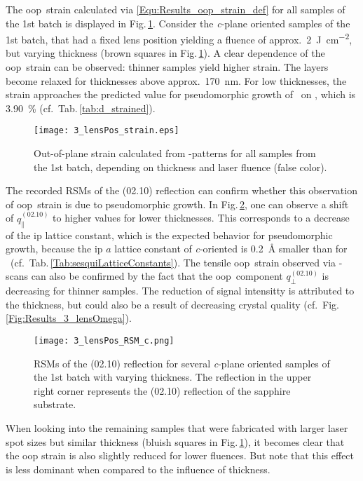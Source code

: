 The \gls{oop}\ strain calculated via \eqref{Equ:Results_oop_strain_def} for all samples of the 1st batch is displayed in Fig.\,\ref{Fig:Results_3_lensStrain}.
Consider the \textit{c}-plane oriented samples of the 1st batch, that had a fixed lens position yielding a fluence of approx.\ \qty{2}{\joule\per\cm\squared}, but varying thickness (brown squares in Fig.\,\ref{Fig:Results_3_lensStrain}).
A clear dependence of the \gls{oop}\ strain can be observed: thinner samples yield higher strain.
The layers become relaxed for thicknesses above approx.\ \qty{170}{\nm}.
For low thicknesses, the strain approaches the predicted value for pseudomorphic growth of \cro\ on , which is \qty{3.90}{\percent} (cf.\ Tab.\,\ref{tab:d_strained}).
\begin{figure}
    \centering
    \texttt{[image: 3\_lensPos\_strain.eps]}
    \caption{
        Out-of-plane strain calculated from \thetaomega-patterns for all samples from the 1st batch, depending on thickness and laser fluence (false color).
    }
    \label{Fig:Results_3_lensStrain}
\end{figure}
The recorded \glspl{RSM} of the (02.10) reflection can confirm whether this observation of \gls{oop}\ strain is due to pseudomorphic growth.
In Fig.\,\ref{Fig:Results_3_cRSMs}, one can observe a shift of $q_\parallel^{(02.10)}$ to higher values for lower thicknesses.
This corresponds to a decrease of the \gls{ip} lattice constant, which is the expected behavior for pseudomorphic growth, because the \gls{ip} $a$ lattice constant of \textit{c}-oriented  is \qty{0.2}{\angstrom} smaller than for \cro\ (cf.~Tab.\,\ref{Tab:sesquiLatticeConstants}).
The tensile \gls{oop}\ strain observed via \thetaomega-scans can also be confirmed by the fact that the \gls{oop}\ component $q_\perp^{(02.10)}$ is decreasing for thinner samples.
The reduction of signal intensitty is attributed to the thickness, but could also be a result of decreasing crystal quality (cf.~Fig.\,\ref{Fig:Results_3_lensOmega}).
\begin{figure}
    \centering
    \texttt{[image: 3\_lensPos\_RSM\_c.png]}
    \caption{
        \glspl{RSM} of the (02.10) reflection for several \textit{c}-plane oriented samples of the 1st batch with varying thickness.
        The reflection in the upper right corner represents the (02.10) reflection of the sapphire substrate.
    }
    \label{Fig:Results_3_cRSMs}
\end{figure}
When looking into the remaining samples that were fabricated with larger laser spot sizes but similar thickness (bluish squares in Fig.\,\ref{Fig:Results_3_lensStrain}), it becomes clear that the \gls{oop} strain is also slightly reduced for lower fluences.
But note that this effect is less dominant when compared to the influence of thickness.

